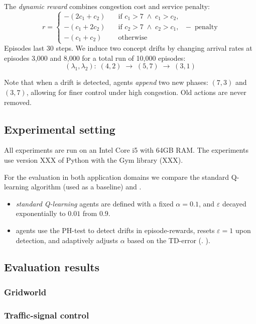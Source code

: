 The \emph{dynamic reward} combines congestion cost and service penalty:
\[
r = 
\begin{cases}
-(2c_1 + c_2)\quad &\text{if }c_1>7 \;\wedge\;c_1>c_2,\\
-(c_1 + 2c_2)\quad &\text{if }c_2>7 \;\wedge\;c_2>c_1,\\
-(c_1 + c_2)\quad &\text{otherwise}
\end{cases}
\;-\;\mathrm{penalty}\,
\]
Episodes last 30 steps. We induce two concept drifts by changing arrival rates at episodes 3,000 and 8,000 for a total run of 10,000 episodes:
\[
(\lambda_1,\lambda_2):
\;(4,2)\;\to\;(5,7)\;\to\;(3,1)
\]

Note that when a drift is detected, agents \emph{append} two new phases:
$(7,3)$ and $(3,7)$, allowing for finer control under high congestion. Old actions are never removed.

\subsection{Experimental setting}
All experiments are run on an Intel Core i5 with 64GB RAM. The experiments use version XXX of Python with the Gym library (XXX). 

For the evaluation in both application domains we compare the standard Q-learning algorithm (used as a baseline) and \adaptiverl.
\begin{itemize}
  \item \emph{standard Q-learning} agents are defined with a fixed $\alpha=0.1$, and $\varepsilon$ decayed exponentially to $0.01$ from $0.9$.
  \item \adaptiverl agents use the PH-test to detect drifts in episode-rewards, resets $\varepsilon\!=\!1$ upon detection, and adaptively adjusts $\alpha$ based on the TD-error (\cf. ).  
\end{itemize}

\subsection{Evaluation results}

\subsubsection{Gridworld}


\subsubsection{Traffic-signal control}

